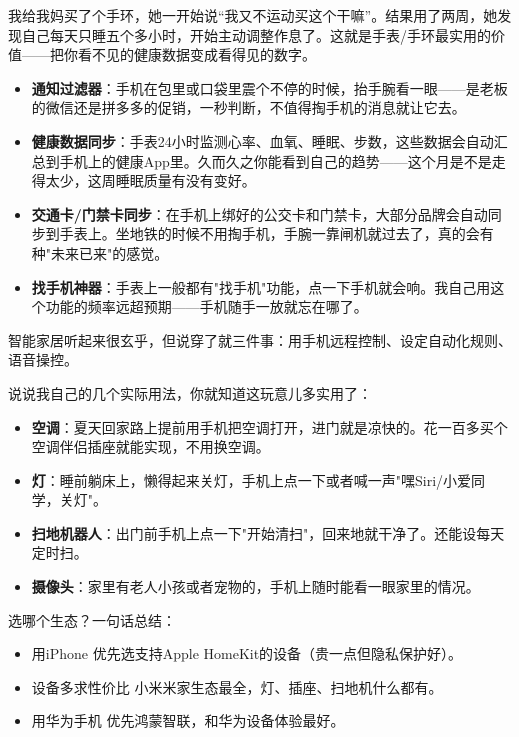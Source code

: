 
我给我妈买了个手环，她一开始说“我又不运动买这个干嘛”。结果用了两周，她发现自己每天只睡五个多小时，开始主动调整作息了。这就是手表/手环最实用的价值——把你看不见的健康数据变成看得见的数字。

\begin{itemize}
  \item \textbf{通知过滤器}：手机在包里或口袋里震个不停的时候，抬手腕看一眼——是老板的微信还是拼多多的促销，一秒判断，不值得掏手机的消息就让它去。
  \item \textbf{健康数据同步}：手表24小时监测心率、血氧、睡眠、步数，这些数据会自动汇总到手机上的健康App里。久而久之你能看到自己的趋势——这个月是不是走得太少，这周睡眠质量有没有变好。
  \item \textbf{交通卡/门禁卡同步}：在手机上绑好的公交卡和门禁卡，大部分品牌会自动同步到手表上。坐地铁的时候不用掏手机，手腕一靠闸机就过去了，真的会有种"未来已来"的感觉。
  \item \textbf{找手机神器}：手表上一般都有"找手机"功能，点一下手机就会响。我自己用这个功能的频率远超预期——手机随手一放就忘在哪了。
\end{itemize}


智能家居听起来很玄乎，但说穿了就三件事：用手机远程控制、设定自动化规则、语音操控。

说说我自己的几个实际用法，你就知道这玩意儿多实用了：

\begin{itemize}
  \item \textbf{空调}：夏天回家路上提前用手机把空调打开，进门就是凉快的。花一百多买个空调伴侣插座就能实现，不用换空调。
  \item \textbf{灯}：睡前躺床上，懒得起来关灯，手机上点一下或者喊一声"嘿Siri/小爱同学，关灯"。
  \item \textbf{扫地机器人}：出门前手机上点一下"开始清扫"，回来地就干净了。还能设每天定时扫。
  \item \textbf{摄像头}：家里有老人小孩或者宠物的，手机上随时能看一眼家里的情况。
\end{itemize}

选哪个生态？一句话总结：

\begin{itemize}
  \item 用iPhone 优先选支持Apple HomeKit的设备（贵一点但隐私保护好）。
  \item 设备多求性价比 小米米家生态最全，灯、插座、扫地机什么都有。
  \item 用华为手机 优先鸿蒙智联，和华为设备体验最好。
\end{itemize}

